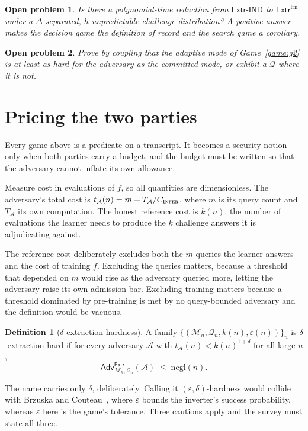 \documentclass[11pt]{article}
\theoremstyle{definition}
\newtheorem{definition}{Definition}
\theoremstyle{plain}
\newtheorem{openq}{Open problem}
\newcommand{\Adv}{\mathsf{Adv}}
\newcommand{\A}{\mathcal{A}}
\newcommand{\Q}{\mathcal{Q}}
\newcommand{\M}{\mathcal{M}}
\newcommand{\INFER}{\textsc{Infer}}
\begin{document}
\begin{openq}
\label{oq:converse}
Is there a polynomial-time reduction from $\mathsf{Extr}\text{-}\mathsf{IND}$ to
$\mathsf{Extr}^{\mathrm{lrn}}$ under a $\Delta$-separated, $h$-unpredictable
challenge distribution? A positive answer makes the decision game the definition of
record and the search game a corollary.
\end{openq}

\begin{openq}
\label{oq:adapt}
Prove by coupling that the adaptive mode of Game~\ref{game:g2} is at least as hard
for the adversary as the committed mode, or exhibit a $\Q$ where it is not.
\end{openq}

\section{Pricing the two parties}
\label{sec:price}

Every game above is a predicate on a transcript. It becomes a security notion only
when both parties carry a budget, and the budget must be written so that the
adversary cannot inflate its own allowance.

Measure cost in evaluations of $f$, so all quantities are dimensionless. The
adversary's total cost is $t_\A(n) = m + T_\A/C_{\INFER}$, where $m$ is its query
count and $T_\A$ its own computation. The honest reference cost is $k(n)$, the
number of evaluations the learner needs to produce the $k$ challenge answers it is
adjudicating against.

The reference cost deliberately excludes both the $m$ queries the learner answers
and the cost of training $f$. Excluding the queries matters, because a threshold
that depended on $m$ would rise as the adversary queried more, letting the
adversary raise its own admission bar. Excluding training matters because a
threshold dominated by pre-training is met by no query-bounded adversary and the
definition would be vacuous.

\begin{definition}[$\delta$-extraction hardness]
\label{def:fg}
A family $\{(\M_n, \Q_n, k(n), \varepsilon(n))\}_n$ is $\delta$-extraction hard if
for every adversary $\A$ with $t_\A(n) < k(n)^{1+\delta}$ for all large $n$,
\[
\Adv^{\mathsf{Extr}}_{\M_n,\Q_n}(\A) \;\le\; \mathrm{negl}(n).
\]
\end{definition}

The name carries only $\delta$, deliberately. Calling it
$(\varepsilon,\delta)$-hardness would collide with Brzuska and
Couteau~\cite{BC22}, where $\varepsilon$ bounds the inverter's success
probability, whereas $\varepsilon$ here is the game's tolerance. Three cautions
apply and the survey must state all three.
\end{document}
